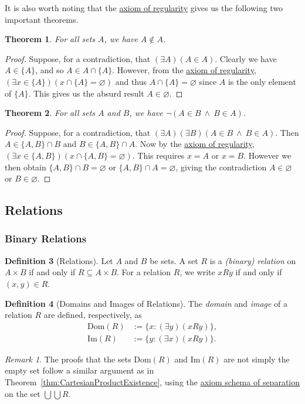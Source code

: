\documentclass[a4paper,11pt]{article}
\theoremstyle{plain}
\newtheorem{thm}{Theorem}[subsection]
\theoremstyle{definition}
\newtheorem{defn}[thm]{Definition}
\theoremstyle{remark}
\newtheorem*{rem}{Remark}
\begin{document}
It is also worth noting that the \hyperref[axiom:regularity]{axiom of regularity} gives us the following two important theorems.
\begin{thm}
\label{thm:AinA}
For all sets $A$, we have $A \notin A$.
\end{thm}
\begin{proof}
Suppose, for a contradiction, that $(\exists A)(A \in A)$. Clearly we have $A \in \{A\}$, and so $A \in A \cap \{A\}$. However, from the \hyperref[axiom:regularity]{axiom of regularity}, $(\exists x \in \{A\})(x \cap \{A\} = \varnothing)$ and thus $A \cap \{A\} = \varnothing$ since $A$ is the only element of $\{A\}$. This gives us the absurd result $A \in \varnothing$.
\end{proof}

\begin{thm}
\label{thm:AinBandBinA}
For all sets $A$ and $B$, we have $\lnot(A\in B \ \land \ B\in A)$.
\end{thm}
\begin{proof}
Suppose, for a contradiction, that $(\exists A)(\exists B)(A\in B \ \land \ B\in A)$. Then $A \in \{A,B\} \cap B$ and $B \in \{A,B\}\cap A$. Now by the \hyperref[axiom:regularity]{axiom of regularity}, $(\exists x\in\{A,B\})(x \cap \{A,B\} = \varnothing)$. This requires $x = A$ or $x = B$. However we then obtain $\{A,B\} \cap B = \varnothing$ or $\{A,B\}\cap A = \varnothing$, giving the contradiction $A \in \varnothing$ or $B \in \varnothing$.
\end{proof}

\subsection{Relations}
\subsubsection{Binary Relations}
\begin{defn}[Relations]
Let $A$ and $B$ be sets. A set $R$ is a \textit{(binary) relation} on $A\times B$ if and only if $R \subseteq A \times B$. For a relation $R$, we write $xRy$ if and only if $(x, y) \in R$.
\end{defn}

\begin{defn}[Domains and Images of Relations]
The \textit{domain} and \textit{image} of a relation $R$ are defined, respectively, as
\begin{align*}
\mathrm{Dom} (R) &:= \{x : (\exists y)(xRy)\}, \\
\mathrm{Im} (R) &:= \{y : (\exists x)(xRy)\}.
\end{align*}
\end{defn}
\begin{rem} The proofs that the sets $\mathrm{Dom}(R)$ and $\mathrm{Im}(R)$ are not simply the empty set follow a similar argument as in Theorem~\ref{thm:CartesianProductExistence}, using the \hyperref[axiom:separation]{axiom schema of separation} on the set $\bigcup \bigcup R$.
\end{rem}
\end{document}
